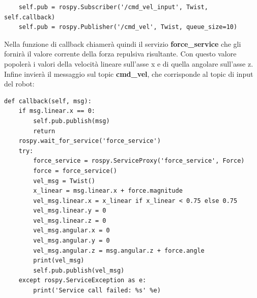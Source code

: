 \documentclass[Lau, binding=0.6cm, oneside]{sapthesis}
\begin{document}
\begin{lstlisting}
    self.pub = rospy.Subscriber('/cmd_vel_input', Twist, self.callback)
    self.pub = rospy.Publisher('/cmd_vel', Twist, queue_size=10)
\end{lstlisting}

Nella funzione di callback chiamerà quindi il servizio \textbf{force\_service} che gli fornirà il valore corrente della forza repulsiva risultante.
Con questo valore popolerà i valori della velocità lineare sull'asse x e di quella angolare sull'asse z.
Infine invierà il messaggio sul topic \textbf{cmd\_vel}, che corrisponde al topic di input del robot:

\begin{lstlisting}
def callback(self, msg):
    if msg.linear.x == 0:
        self.pub.publish(msg)
        return
    rospy.wait_for_service('force_service')
    try:
        force_service = rospy.ServiceProxy('force_service', Force)
        force = force_service()
        vel_msg = Twist()
        x_linear = msg.linear.x + force.magnitude
        vel_msg.linear.x = x_linear if x_linear < 0.75 else 0.75
        vel_msg.linear.y = 0
        vel_msg.linear.z = 0
        vel_msg.angular.x = 0
        vel_msg.angular.y = 0
        vel_msg.angular.z = msg.angular.z + force.angle
        print(vel_msg)
        self.pub.publish(vel_msg)
    except rospy.ServiceException as e:
        print('Service call failed: %s' %e)
\end{lstlisting}



\end{document}
